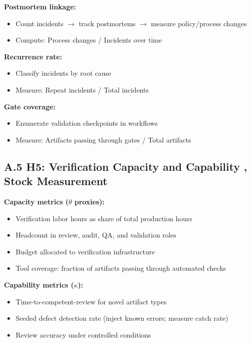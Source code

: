 \documentclass[11pt,a4paper]{article}
\providecommand{\tightlist}{\setlength{\itemsep}{0pt}\setlength{\parskip}{0pt}}
\begin{document}
\textbf{Postmortem linkage:}

\begin{itemize}
\tightlist
\item
  Count incidents $\to$ track postmortems $\to$ measure policy/process changes
\item
  Compute: Process changes / Incidents over time
\end{itemize}

\textbf{Recurrence rate:}

\begin{itemize}
\tightlist
\item
  Classify incidents by root cause
\item
  Measure: Repeat incidents / Total incidents
\end{itemize}

\textbf{Gate coverage:}

\begin{itemize}
\tightlist
\item
  Enumerate validation checkpoints in workflows
\item
  Measure: Artifacts passing through gates / Total artifacts
\end{itemize}

\hypertarget{a.5-h5-verification-capacity-and-capability-stock-measurement}{%
\subsection{A.5 H5: Verification Capacity and Capability ,  Stock Measurement}\label{a.5-h5-verification-capacity-and-capability-stock-measurement}}

\textbf{Capacity metrics ($\theta$ proxies):}

\begin{itemize}
\tightlist
\item
  Verification labor hours as share of total production hours
\item
  Headcount in review, audit, QA, and validation roles
\item
  Budget allocated to verification infrastructure
\item
  Tool coverage: fraction of artifacts passing through automated checks
\end{itemize}

\textbf{Capability metrics ($\kappa$):}

\begin{itemize}
\tightlist
\item
  Time-to-competent-review for novel artifact types
\item
  Seeded defect detection rate (inject known errors; measure catch rate)
\item
  Review accuracy under controlled conditions
\end{itemize}
\end{document}
